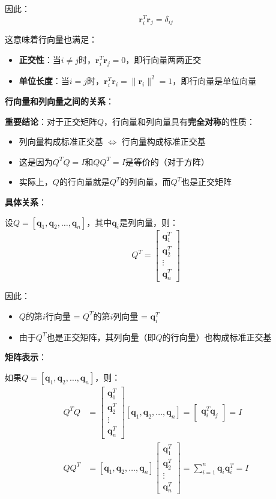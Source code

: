 \documentclass[12pt,a4paper]{article}
\begin{document}
因此：
\begin{equation}
\bm{r}_i^T \bm{r}_j = \delta_{ij}
\end{equation}

这意味着行向量也满足：
\begin{itemize}
\item \textbf{正交性}：当$i \neq j$时，$\bm{r}_i^T \bm{r}_j = 0$，即行向量两两正交
\item \textbf{单位长度}：当$i = j$时，$\bm{r}_i^T \bm{r}_i = \|\bm{r}_i\|^2 = 1$，即行向量是单位向量
\end{itemize}

\textbf{行向量和列向量之间的关系}：

\textbf{重要结论}：对于正交矩阵$Q$，行向量和列向量具有\textbf{完全对称}的性质：
\begin{itemize}
\item 列向量构成标准正交基 $\Longleftrightarrow$ 行向量构成标准正交基
\item 这是因为$Q^T Q = I$和$Q Q^T = I$是等价的（对于方阵）
\item 实际上，$Q$的行向量就是$Q^T$的列向量，而$Q^T$也是正交矩阵
\end{itemize}

\textbf{具体关系}：

设$Q = [\bm{q}_1, \bm{q}_2, \ldots, \bm{q}_n]$，其中$\bm{q}_i$是列向量，则：
\begin{equation}
Q^T = \begin{bmatrix} \bm{q}_1^T \\ \bm{q}_2^T \\ \vdots \\ \bm{q}_n^T \end{bmatrix}
\end{equation}

因此：
\begin{itemize}
\item $Q$的第$i$行向量 = $Q^T$的第$i$列向量 = $\bm{q}_i^T$
\item 由于$Q^T$也是正交矩阵，其列向量（即$Q$的行向量）也构成标准正交基
\end{itemize}

\textbf{矩阵表示}：

如果$Q = [\bm{q}_1, \bm{q}_2, \ldots, \bm{q}_n]$，则：
\begin{align}
Q^T Q &= \begin{bmatrix} \bm{q}_1^T \\ \bm{q}_2^T \\ \vdots \\ \bm{q}_n^T \end{bmatrix} [\bm{q}_1, \bm{q}_2, \ldots, \bm{q}_n] = \begin{bmatrix} \bm{q}_i^T \bm{q}_j \end{bmatrix} = I \\
Q Q^T &= [\bm{q}_1, \bm{q}_2, \ldots, \bm{q}_n] \begin{bmatrix} \bm{q}_1^T \\ \bm{q}_2^T \\ \vdots \\ \bm{q}_n^T \end{bmatrix} = \sum_{i=1}^n \bm{q}_i \bm{q}_i^T = I
\end{align}
\end{document}
